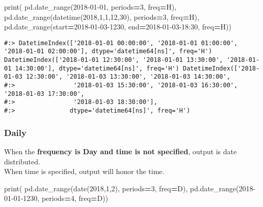 \documentclass[
]{book}
\newenvironment{Shaded}{\begin{snugshade}}{\end{snugshade}}
\newcommand{\BuiltInTok}[1]{#1}
\newcommand{\DecValTok}[1]{\textcolor[rgb]{0.06,0.06,0.06}{#1}}
\newcommand{\NormalTok}[1]{#1}
\newcommand{\OperatorTok}[1]{\textcolor[rgb]{0.43,0.43,0.43}{\textbf{#1}}}
\newcommand{\StringTok}[1]{\textcolor[rgb]{0.5,0.5,0.5}{#1}}
\begin{document}
\begin{Shaded}
\begin{Highlighting}[]
\BuiltInTok{print}\NormalTok{(}
\NormalTok{  pd.date\_range(}\StringTok{\textquotesingle{}2018{-}01{-}01\textquotesingle{}}\NormalTok{, periods}\OperatorTok{=}\DecValTok{3}\NormalTok{, freq}\OperatorTok{=}\StringTok{\textquotesingle{}H\textquotesingle{}}\NormalTok{),}
\NormalTok{  pd.date\_range(datetime(}\DecValTok{2018}\NormalTok{,}\DecValTok{1}\NormalTok{,}\DecValTok{1}\NormalTok{,}\DecValTok{12}\NormalTok{,}\DecValTok{30}\NormalTok{), periods}\OperatorTok{=}\DecValTok{3}\NormalTok{, freq}\OperatorTok{=}\StringTok{\textquotesingle{}H\textquotesingle{}}\NormalTok{),}
\NormalTok{  pd.date\_range(start}\OperatorTok{=}\StringTok{\textquotesingle{}2018{-}01{-}03{-}1230\textquotesingle{}}\NormalTok{, end}\OperatorTok{=}\StringTok{\textquotesingle{}2018{-}01{-}03{-}18:30\textquotesingle{}}\NormalTok{, freq}\OperatorTok{=}\StringTok{\textquotesingle{}H\textquotesingle{}}\NormalTok{))}
\end{Highlighting}
\end{Shaded}

\begin{verbatim}
#:> DatetimeIndex(['2018-01-01 00:00:00', '2018-01-01 01:00:00', '2018-01-01 02:00:00'], dtype='datetime64[ns]', freq='H') DatetimeIndex(['2018-01-01 12:30:00', '2018-01-01 13:30:00', '2018-01-01 14:30:00'], dtype='datetime64[ns]', freq='H') DatetimeIndex(['2018-01-03 12:30:00', '2018-01-03 13:30:00', '2018-01-03 14:30:00',
#:>                '2018-01-03 15:30:00', '2018-01-03 16:30:00', '2018-01-03 17:30:00',
#:>                '2018-01-03 18:30:00'],
#:>               dtype='datetime64[ns]', freq='H')
\end{verbatim}

\hypertarget{daily}{%
\subsubsection{Daily}\label{daily}}

When the \textbf{frequency is Day and time is not specified}, output is date distributed.\\
When time is specified, output will honor the time.

\begin{Shaded}
\begin{Highlighting}[]
\BuiltInTok{print}\NormalTok{(}
\NormalTok{  pd.date\_range(date(}\DecValTok{2018}\NormalTok{,}\DecValTok{1}\NormalTok{,}\DecValTok{2}\NormalTok{), periods}\OperatorTok{=}\DecValTok{3}\NormalTok{, freq}\OperatorTok{=}\StringTok{\textquotesingle{}D\textquotesingle{}}\NormalTok{),}
\NormalTok{  pd.date\_range(}\StringTok{\textquotesingle{}2018{-}01{-}01{-}1230\textquotesingle{}}\NormalTok{, periods}\OperatorTok{=}\DecValTok{4}\NormalTok{, freq}\OperatorTok{=}\StringTok{\textquotesingle{}D\textquotesingle{}}\NormalTok{))}
\end{Highlighting}
\end{Shaded}
\end{document}
